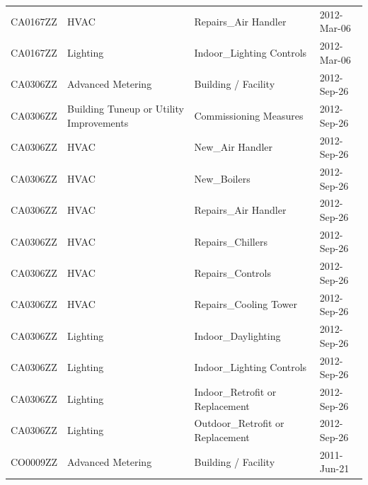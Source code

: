 \documentclass[12pt]{article}
\begin{document}
\begin{longtable}{lp{4cm}p{4cm}p{3cm}}
CA0167ZZ         & HVAC                                    & Repairs\_Air Handler                      & 2012-Mar-06                   \\
CA0167ZZ         & Lighting                                & Indoor\_Lighting Controls                 & 2012-Mar-06                   \\
CA0306ZZ         & Advanced Metering                       & Building / Facility                       & 2012-Sep-26                   \\
CA0306ZZ         & Building Tuneup or Utility Improvements & Commissioning Measures                    & 2012-Sep-26                   \\
CA0306ZZ         & HVAC                                    & New\_Air Handler                          & 2012-Sep-26                   \\
CA0306ZZ         & HVAC                                    & New\_Boilers                              & 2012-Sep-26                   \\
CA0306ZZ         & HVAC                                    & Repairs\_Air Handler                      & 2012-Sep-26                   \\
CA0306ZZ         & HVAC                                    & Repairs\_Chillers                         & 2012-Sep-26                   \\
CA0306ZZ         & HVAC                                    & Repairs\_Controls                         & 2012-Sep-26                   \\
CA0306ZZ         & HVAC                                    & Repairs\_Cooling Tower                    & 2012-Sep-26                   \\
CA0306ZZ         & Lighting                                & Indoor\_Daylighting                       & 2012-Sep-26                   \\
CA0306ZZ         & Lighting                                & Indoor\_Lighting Controls                 & 2012-Sep-26                   \\
CA0306ZZ         & Lighting                                & Indoor\_Retrofit or Replacement           & 2012-Sep-26                   \\
CA0306ZZ         & Lighting                                & Outdoor\_Retrofit or Replacement          & 2012-Sep-26                   \\
CO0009ZZ         & Advanced Metering                       & Building / Facility                       & 2011-Jun-21                   \\

\end{longtable}
\end{document}
